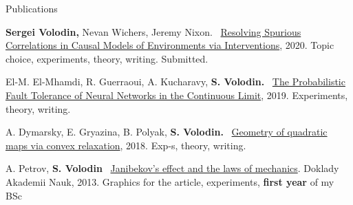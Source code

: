 \documentclass{resume} %
\newcommand{\mylink}{{\color{gray}\faExternalLink}}
\begin{document}

\begin{rSection}{Publications}
\vspace{-1em}
\item {\bf Sergei Volodin,} Nevan Wichers, Jeremy Nixon. \mylink~\href{https://arxiv.org/pdf/2002.05217.pdf}{Resolving Spurious Correlations in Causal Models of Environments via Interventions}, 2020. Topic choice, experiments, theory, writing. Submitted.
\item El-M. El-Mhamdi, R. Guerraoui, A. Kucharavy, {\bf \color{grayheading} S. Volodin.} \mylink~\href{https://arxiv.org/abs/1902.01686}{The Probabilistic Fault Tolerance of Neural Networks in the Continuous Limit}, 2019. Experiments, theory,  writing. %
\item A. Dymarsky, E. Gryazina, B. Polyak, {\bf \color{grayheading} S. Volodin.} \mylink~\href{https://arxiv.org/pdf/1810.00896.pdf}{Geometry of quadratic maps via convex relaxation}, 2018. Exp-s, theory, writing.%
\item A. Petrov, {\bf \color{grayheading} S. Volodin} \mylink~\href{https://link.springer.com/article/10.1134/S1028335813080041}{Janibekov's effect and the laws of mechanics}. Doklady Akademii Nauk, 2013. Graphics for the article, experiments, {\bf first year} of my BSc
\end{rSection}
\end{document}

